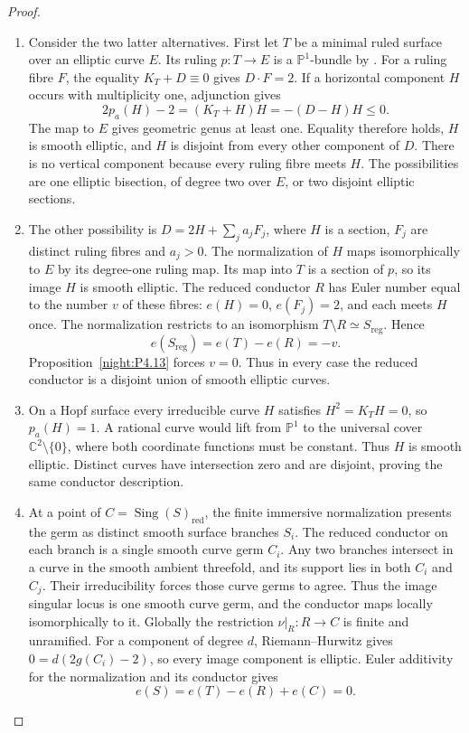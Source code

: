 \begin{proof}
\begin{enumerate}[label={$\langle1\rangle$\arabic*.},leftmargin=*]
\item Consider the two latter alternatives. First let $T$ be a
minimal ruled surface over an elliptic curve $E$. Its ruling
$p:T\to E$ is a $\mathbb P^1$-bundle by
\cite[III.10, p.~40]{Beauville1978}. For a ruling fibre $F$,
the equality $K_T+D\equiv0$ gives $D\cdot F=2$.
If a horizontal component $H$ occurs with multiplicity one,
adjunction gives
\[
 2p_a(H)-2=(K_T+H)H=-(D-H)H\leq0.
\]
The map to $E$ gives geometric genus at least one. Equality
therefore holds, $H$ is smooth elliptic, and $H$ is disjoint
from every other component of $D$. There is no vertical
component because every ruling fibre meets $H$. The possibilities
are one elliptic bisection, of degree two over $E$, or two
disjoint elliptic sections.

\item The other possibility is $D=2H+\sum_j a_jF_j$, where $H$ is a
section, $F_j$ are distinct ruling fibres and $a_j>0$.
The normalization of $H$ maps isomorphically to $E$ by its
degree-one ruling map. Its map into $T$ is a section of $p$,
so its image $H$ is smooth elliptic.
The reduced conductor $R$ has Euler number equal to the number $v$
of these fibres: $e(H)=0$, $e(F_j)=2$, and each meets $H$ once.
The normalization restricts to an isomorphism
$T\setminus R\simeq S_{\mathrm{reg}}$. Hence
\[
 e(S_{\mathrm{reg}})=e(T)-e(R)=-v.
\]
Proposition~\ref{night:P4.13} forces $v=0$. Thus in every case the reduced conductor is
a disjoint union of smooth elliptic curves.

\item On a Hopf surface every irreducible curve $H$ satisfies
$H^2=K_TH=0$, so $p_a(H)=1$. A rational curve would lift from
$\mathbb P^1$ to the universal cover $\mathbb C^2\setminus\{0\}$,
where both coordinate functions must be constant. Thus $H$
is smooth elliptic. Distinct curves have intersection zero and
are disjoint, proving the same conductor description.

\item At a point of $C=\operatorname{Sing}(S)_{\mathrm{red}}$,
the finite immersive normalization presents the germ as distinct
smooth surface branches $S_i$. The reduced conductor on each branch is a single
smooth curve germ $C_i$. Any two branches intersect in a curve
in the smooth ambient threefold, and its support lies in both
$C_i$ and $C_j$. Their irreducibility forces those curve germs
to agree. Thus the image singular locus is one smooth curve
germ, and the conductor maps locally isomorphically to it.
Globally the restriction $\nu|_R:R\to C$ is finite and unramified.
For a component of degree $d$, Riemann--Hurwitz gives
$0=d(2g(C_i)-2)$, so every image component is elliptic.
Euler additivity for the normalization and its conductor gives
\[
 e(S)=e(T)-e(R)+e(C)=0.
\]

\end{enumerate}
\end{proof}